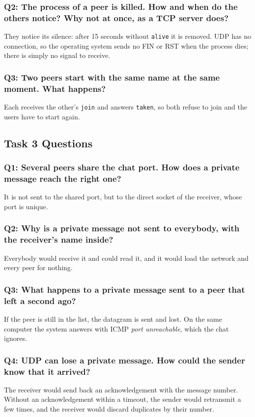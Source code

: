 \documentclass[11pt, a4paper]{article}
\begin{document}
\subsubsection{Q2: The process of a peer is killed. How and when do the others notice? Why not at once, as a TCP server does?}
They notice its silence: after 15 seconds without \texttt{alive} it is removed. UDP has no connection, so the operating system sends no FIN or RST when the process dies; there is simply no signal to receive.

\subsubsection{Q3: Two peers start with the same name at the same moment. What happens?}
Each receives the other's \texttt{join} and answers \texttt{taken}, so both refuse to join and the users have to start again.

\subsection{Task 3 Questions}
\subsubsection{Q1: Several peers share the chat port. How does a private message reach the right one?}
It is not sent to the shared port, but to the direct socket of the receiver, whose port is unique.

\subsubsection{Q2: Why is a private message not sent to everybody, with the receiver's name inside?}
Everybody would receive it and could read it, and it would load the network and every peer for nothing.

\subsubsection{Q3: What happens to a private message sent to a peer that left a second ago?}
If the peer is still in the list, the datagram is sent and lost. On the same computer the system answers with ICMP \emph{port unreachable}, which the chat ignores.

\subsubsection{Q4: UDP can lose a private message. How could the sender know that it arrived?}
The receiver would send back an acknowledgement with the message number. Without an acknowledgement within a timeout, the sender would retransmit a few times, and the receiver would discard duplicates by their number.
\end{document}
